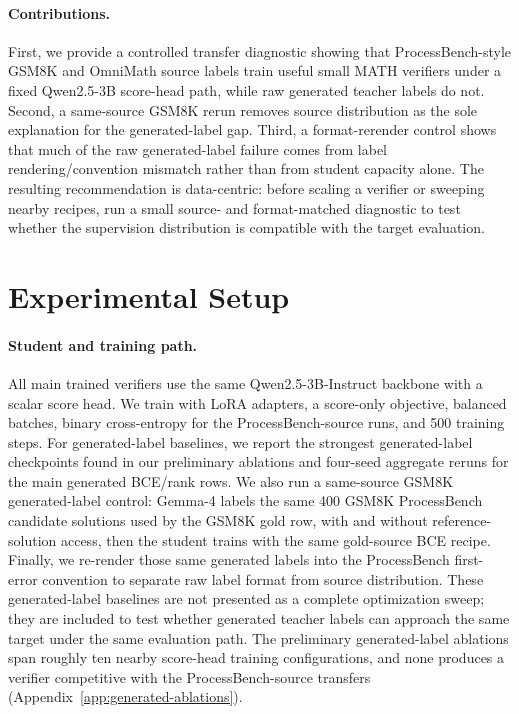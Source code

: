 \documentclass{article}
\begin{document}
\paragraph{Contributions.}
First, we provide a controlled transfer diagnostic showing that ProcessBench-style GSM8K and OmniMath source labels train useful small MATH verifiers under a fixed Qwen2.5-3B score-head path, while raw generated teacher labels do not.
Second, a same-source GSM8K rerun removes source distribution as the sole explanation for the generated-label gap.
Third, a format-rerender control shows that much of the raw generated-label failure comes from label rendering/convention mismatch rather than from student capacity alone.
The resulting recommendation is data-centric: before scaling a verifier or sweeping nearby recipes, run a small source- and format-matched diagnostic to test whether the supervision distribution is compatible with the target evaluation.

\section{Experimental Setup}

\paragraph{Student and training path.}
All main trained verifiers use the same Qwen2.5-3B-Instruct backbone with a scalar score head.
We train with LoRA adapters, a score-only objective, balanced batches, binary cross-entropy for the ProcessBench-source runs, and 500 training steps.
For generated-label baselines, we report the strongest generated-label checkpoints found in our preliminary ablations and four-seed aggregate reruns for the main generated BCE/rank rows.
We also run a same-source GSM8K generated-label control: Gemma-4 labels the same 400 GSM8K ProcessBench candidate solutions used by the GSM8K gold row, with and without reference-solution access, then the student trains with the same gold-source BCE recipe.
Finally, we re-render those same generated labels into the ProcessBench first-error convention to separate raw label format from source distribution.
These generated-label baselines are not presented as a complete optimization sweep; they are included to test whether generated teacher labels can approach the same target under the same evaluation path.
The preliminary generated-label ablations span roughly ten nearby score-head training configurations, and none produces a verifier competitive with the ProcessBench-source transfers (Appendix~\ref{app:generated-ablations}).
\end{document}
